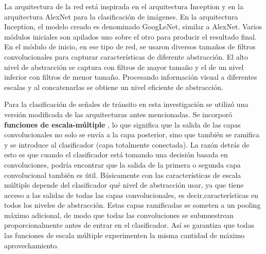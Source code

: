 	La arquitectura de la red está inspirada en el arquitectura Inception \citep{Inception} y en la arquitectura AlexNet\citep{Krizhevsky2012} para la clasificación de imágenes. En la arquitectura Inception, el modelo creado es denominado GoogLeNet, similar a AlexNet. Varios módulos iniciales son apilados uno sobre el otro para producir el resultado final. En el módulo de inicio, en ese tipo de red, se usaron diversos tamaños de filtros convolucionales para capturar características de diferente abstracción. El alto nivel de abstracción se captura con filtros de mayor tamaño y el de un nivel inferior con filtros de menor tamaño. Procesando información visual a diferentes escalas y al concatenarlas se obtiene un nivel eficiente de abstracción. 

	Para la clasificación de señales de tránsito en esta investigación se utilizó una versión modificada de las arquitecturas antes mencionadas. Se incorporó {\bf funciones de escala-múltiple} \citep{Multi_scale_feat}, lo que significa que la salida de las capas convolucionales no solo se envía a la capa posterior, sino que también se ramifica y se introduce al clasificador (capa totalmente conectada). La razón detrás de esto es que cuando el clasificador está tomando una decisión basada en convoluciones, podría encontrar que la salida de la primera o segunda capa convolucional también es útil. Básicamente con las características de escala múltiple depende del clasificador qué nivel de abstracción usar, ya que tiene acceso a las salidas de todas las capas convolucionales, es decir,características en todos los niveles de abstracción. Estas capas ramificadas se someten a un pooling máximo adicional, de modo que todas las convoluciones se submuestrean proporcionalmente antes de entrar en el clasificador. Así se garantiza que todas las funciones de escala múltiple experimenten la misma cantidad de máximo aprovechamiento.
	
